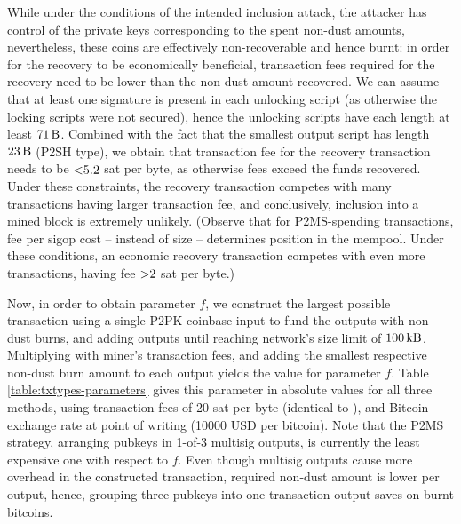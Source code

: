 \documentclass[a4paper,11pt,titlepage]{scrbook}
\begin{document}
While under the conditions of the intended inclusion attack, the attacker has control of the private keys corresponding to the spent non-dust amounts, nevertheless, these coins are effectively non-recoverable and hence burnt: in order for the recovery to be economically beneficial, transaction fees required for the recovery need to be lower than the non-dust amount recovered.
We can assume that at least one signature is present in each unlocking script (as otherwise the locking scripts were not secured), hence the unlocking scripts have each length at least $\SI{71}{\byte}$. Combined with the fact that the smallest output script has length $\SI{23}{\byte}$ (P2SH type), we obtain that transaction fee for the recovery transaction needs to be $\num{<5.2}$ sat per byte, as otherwise fees exceed the funds recovered.
Under these constraints, the recovery transaction competes with many transactions having larger transaction fee, and conclusively, inclusion into a mined block is extremely unlikely.
(Observe that for P2MS-spending transactions, fee per sigop cost – instead of size – determines position in the mempool. Under these conditions, an economic recovery transaction competes with even more transactions, having fee $\num{>2}$ sat per byte.)


Now, in order to obtain parameter $f$, we construct the largest possible transaction  using a single P2PK coinbase input to fund the outputs with non-dust burns, and adding outputs until reaching network's size limit of $\SI{100}{\kilo\byte}$.
Multiplying with miner's transaction fees, and adding the smallest respective non-dust burn amount to each output yields the value for parameter $f$.
Table \ref{table:txtypes-parameters} gives this parameter in absolute values for all three methods, using transaction fees of 20 sat per byte (identical to \cite{sward_data_2018}), and Bitcoin exchange rate at point of writing (\num{10000} USD per bitcoin).
Note that the P2MS strategy, arranging pubkeys in 1-of-3 multisig outputs, is currently the least expensive one with respect to $f$.
Even though multisig outputs cause more overhead in the constructed transaction, required non-dust amount is lower per output, hence, grouping three pubkeys into one transaction output saves on burnt bitcoins.
\end{document}
